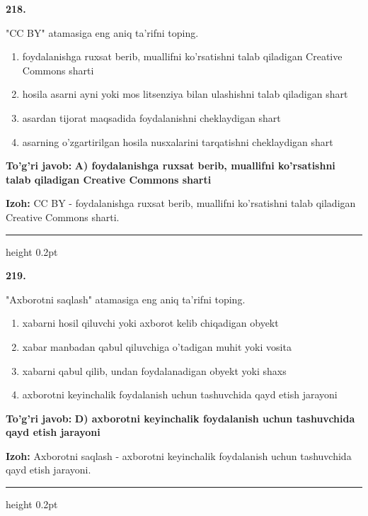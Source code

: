 \documentclass[10pt,a4paper,oneside]{article}
\begin{document}
\noindent\textbf{\color{ink}218.}
\par
"CC BY" atamasiga eng aniq ta'rifni toping.
\begin{enumerate}[label=\Alph*),leftmargin=9mm]
\item foydalanishga ruxsat berib, muallifni ko'rsatishni talab qiladigan Creative Commons sharti
\item hosila asarni ayni yoki mos litsenziya bilan ulashishni talab qiladigan shart
\item asardan tijorat maqsadida foydalanishni cheklaydigan shart
\item asarning o'zgartirilgan hosila nusxalarini tarqatishni cheklaydigan shart
\end{enumerate}
\begin{tcolorbox}[enhanced,breakable,colback=teal!4,colframe=teal!50!black,boxrule=0.5pt,arc=1.1mm,left=3mm,right=3mm,top=1.7mm,bottom=1.7mm,before skip=2mm,after skip=2mm]
\textbf{\color{teal}To'g'ri javob:} \textbf{A) foydalanishga ruxsat berib, muallifni ko'rsatishni talab qiladigan Creative Commons sharti}
\par\smallskip
\textbf{Izoh:} CC BY - foydalanishga ruxsat berib, muallifni ko'rsatishni talab qiladigan Creative Commons sharti.
\end{tcolorbox}
\vspace{2mm}\hrule height 0.2pt \vspace{3mm}

\noindent\textbf{\color{ink}219.}
\par
"Axborotni saqlash" atamasiga eng aniq ta'rifni toping.
\begin{enumerate}[label=\Alph*),leftmargin=9mm]
\item xabarni hosil qiluvchi yoki axborot kelib chiqadigan obyekt
\item xabar manbadan qabul qiluvchiga o'tadigan muhit yoki vosita
\item xabarni qabul qilib, undan foydalanadigan obyekt yoki shaxs
\item axborotni keyinchalik foydalanish uchun tashuvchida qayd etish jarayoni
\end{enumerate}
\begin{tcolorbox}[enhanced,breakable,colback=teal!4,colframe=teal!50!black,boxrule=0.5pt,arc=1.1mm,left=3mm,right=3mm,top=1.7mm,bottom=1.7mm,before skip=2mm,after skip=2mm]
\textbf{\color{teal}To'g'ri javob:} \textbf{D) axborotni keyinchalik foydalanish uchun tashuvchida qayd etish jarayoni}
\par\smallskip
\textbf{Izoh:} Axborotni saqlash - axborotni keyinchalik foydalanish uchun tashuvchida qayd etish jarayoni.
\end{tcolorbox}
\vspace{2mm}\hrule height 0.2pt \vspace{3mm}
\end{document}
